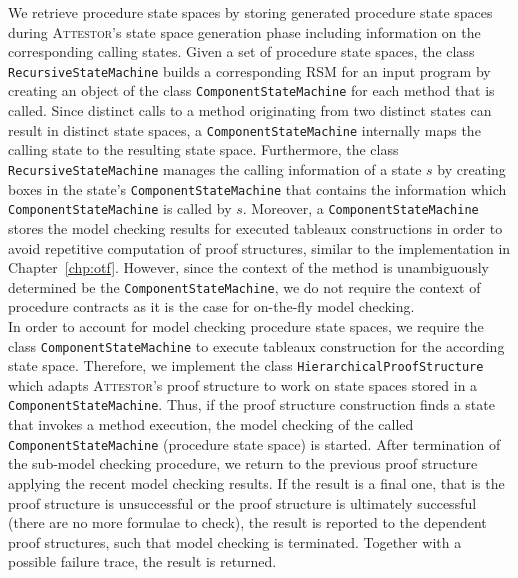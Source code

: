 \documentclass[a4paper, 12pt, twoside]{report}
\begin{document}
	We retrieve procedure state spaces by storing generated procedure state spaces during \textsc{Attestor}'s state space generation phase including information on the corresponding calling states. Given a set of procedure state spaces, the class \texttt{RecursiveStateMachine} builds a corresponding RSM for an input program by creating an object of the class \texttt{ComponentStateMachine} for each method that is called. Since distinct calls to a method originating from two distinct states can result in distinct state spaces, a \texttt{ComponentStateMachine} internally maps the calling state to the resulting state space. Furthermore, the class \texttt{RecursiveStateMachine} manages the calling information of a state $s$ by creating boxes in the state's \texttt{ComponentStateMachine} that contains the information which \texttt{ComponentStateMachine} is called by $s$. Moreover, a \texttt{ComponentStateMachine} stores the model checking results for executed tableaux constructions in order to avoid repetitive computation of proof structures, similar to the implementation in Chapter~\ref{chp:otf}. However, since the context of the method is unambiguously determined be the \texttt{ComponentStateMachine}, we do not require the context of procedure contracts as it is the case for on-the-fly model checking.\\
	
	In order to account for model checking procedure state spaces, we require the class \texttt{ComponentStateMachine} to execute tableaux construction for the according state space. Therefore, we implement the class \texttt{HierarchicalProofStructure} which adapts \textsc{Attestor}'s proof structure to work on state spaces stored in a \texttt{ComponentStateMachine}. 
	Thus, if the proof structure construction finds a state that invokes a method execution, the model checking of the called \texttt{ComponentStateMachine} (procedure state space) is started. After termination of the sub-model checking procedure, we return to the previous proof structure applying the recent model checking results. If the result is a final one, that is the proof structure is unsuccessful or the proof structure is ultimately successful (there are no more formulae to check), the result is reported to the dependent proof structures, such that model checking is terminated. Together with a possible failure trace, the result is returned.\\
	
\end{document}
